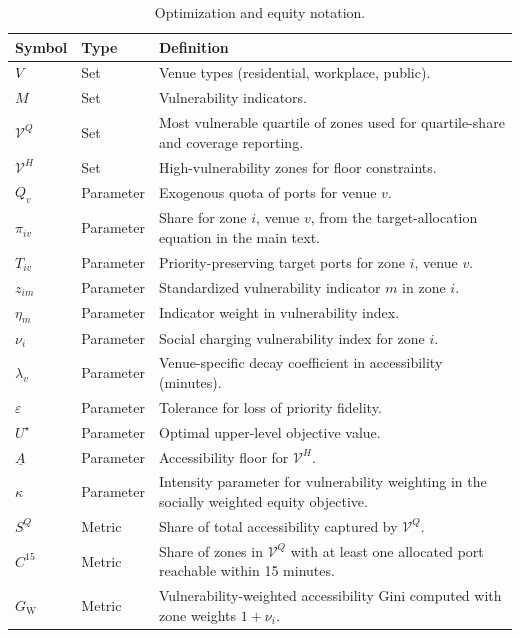 \documentclass[11pt]{article}
\begin{document}
\begin{table}[p]
\centering
\caption{Optimization and equity notation.}
\begin{threeparttable}
\scriptsize
\setlength{\tabcolsep}{3pt}
\renewcommand{\arraystretch}{0.97}
\begin{tabularx}{\textwidth}{Z Z Y}
\toprule
Symbol & Type & Definition \\
\midrule
$V$ & Set & Venue types (residential, workplace, public). \\
$M$ & Set & Vulnerability indicators. \\
$\mathcal{V}^{Q}$ & Set & Most vulnerable quartile of zones used for quartile-share and coverage reporting. \\
$\mathcal{V}^{H}$ & Set & High-vulnerability zones for floor constraints. \\
$Q_v$ & Parameter & Exogenous quota of ports for venue $v$. \\
$\pi_{iv}$ & Parameter & Share for zone $i$, venue $v$, from the target-allocation equation in the main text. \\
$T_{iv}$ & Parameter & Priority-preserving target ports for zone $i$, venue $v$. \\
$z_{im}$ & Parameter & Standardized vulnerability indicator $m$ in zone $i$. \\
$\eta_m$ & Parameter & Indicator weight in vulnerability index. \\
$\nu_i$ & Parameter & Social charging vulnerability index for zone $i$. \\
$\lambda_v$ & Parameter & Venue-specific decay coefficient in accessibility (minutes). \\
$\varepsilon$ & Parameter & Tolerance for loss of priority fidelity. \\
$U^{\star}$ & Parameter & Optimal upper-level objective value. \\
$\underline{A}$ & Parameter & Accessibility floor for $\mathcal{V}^{H}$. \\
$\kappa$ & Parameter & Intensity parameter for vulnerability weighting in the socially weighted equity objective. \\
$S^{Q}$ & Metric & Share of total accessibility captured by $\mathcal{V}^{Q}$. \\
$C^{15}$ & Metric & Share of zones in $\mathcal{V}^{Q}$ with at least one allocated port reachable within 15 minutes. \\
$G_{\mathrm{W}}$ & Metric & Vulnerability-weighted accessibility Gini computed with zone weights $1+\nu_i$. \\

\end{tabularx}
\end{threeparttable}
\end{table}
\end{document}
